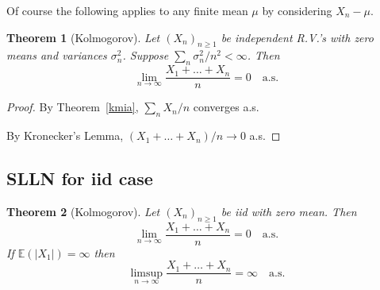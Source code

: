 \documentclass[a4paper]{amsart}
\theoremstyle{plain}
\newtheorem{theorem}{Theorem}[section]
\theoremstyle{definition}
\theoremstyle{remark}
\begin{document}
Of course the following applies to any finite mean $ \mu $ by considering $ X_n - \mu $.
\begin{theorem}[Kolmogorov] \label{ksl} Let $ (X_n)_{n\geq 1}   $ be independent R.V.'s with zero means and variances $ \sigma _n^2 $.  Suppose $ \sum_n \sigma ^2_n/n^2 < \infty $.  Then
 \[
\lim_{n\to \infty}\frac{X_1+\dots +X_n}{n} = 0 \quad \text{a.s.}
\]
\end{theorem}

\begin{proof} By Theorem~\ref{kmia}, $ \sum_n X_n/n $ converges a.s.  
 
 By Kronecker's Lemma, $ (X_1 + \dots + X_n )/n \to 0 $ a.s.
\end{proof} 


\subsection{SLLN for iid case}

\begin{theorem}[Kolmogorov] Let $ (X_n)_{n\geq 1}   $ be iid with zero mean.  Then
 \[
\lim_{n\to \infty}\frac{X_1+\dots +X_n}{n} = 0 \quad \text{a.s.}
\]
If $ \mathbb{E}( |X_1| )= \infty $ then 
\[
\limsup_{n\to \infty } \frac{X_1+\dots +X_n}{n} =\infty  \quad \text{a.s.}
\]
\end{theorem}
\end{document}
